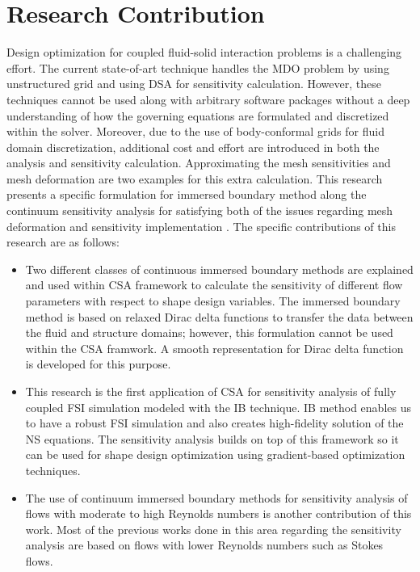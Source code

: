 \section{Research Contribution}
Design optimization for coupled fluid-solid interaction problems is a challenging effort. The current state-of-art technique handles the MDO problem by using unstructured grid and using DSA for sensitivity calculation. However, these techniques cannot be used along with arbitrary software packages without a deep understanding of how the governing equations are formulated and discretized within the solver. Moreover, due to the use of body-conformal grids for fluid domain discretization, additional cost and effort are introduced in both the analysis and sensitivity calculation. Approximating the mesh sensitivities and mesh deformation are two examples for this extra calculation. This research presents a specific formulation for immersed boundary method along the continuum sensitivity analysis for satisfying both of the issues regarding mesh deformation and sensitivity implementation \cite{gobal2014continuum}. The specific contributions of this research are as follows:

\begin{itemize}
	\item Two different classes of continuous immersed boundary methods are explained and used within CSA framework to calculate the sensitivity of different flow parameters with respect to shape design variables. The immersed boundary method is based on relaxed Dirac delta functions to transfer the data between the fluid and structure domains; however, this formulation cannot be used within the CSA framwork. A smooth representation for Dirac delta function is developed for this purpose.
	\item This research is the first application of CSA for sensitivity analysis of fully coupled FSI simulation modeled with the IB technique. IB method enables us to have a robust FSI simulation and also creates high-fidelity solution of the NS equations. The sensitivity analysis builds on top of this framework so it can be used for shape design optimization using gradient-based optimization techniques.
	\item The use of continuum immersed boundary methods for sensitivity analysis of flows with moderate to high Reynolds numbers is another contribution of this work. Most of the previous works done in this area regarding the sensitivity analysis are based on flows with lower Reynolds numbers such as Stokes flows.
\end{itemize}
